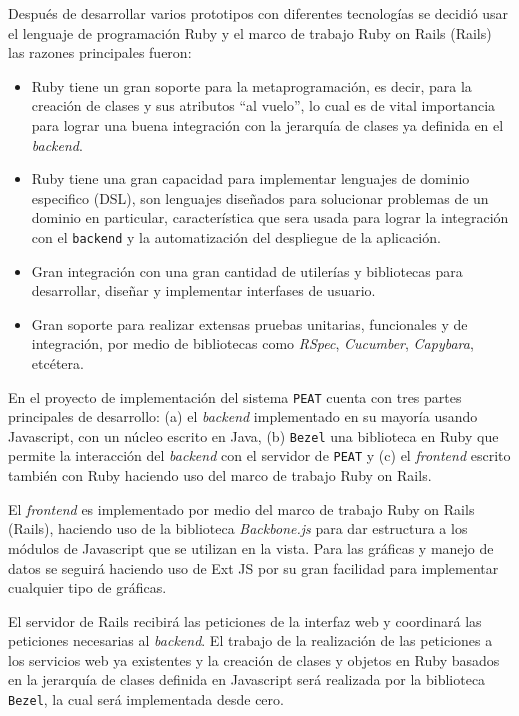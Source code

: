 Después de desarrollar varios prototipos con diferentes tecnologías se decidió
usar el lenguaje de programación Ruby y el marco de trabajo Ruby on Rails (Rails)
las razones principales fueron:

\begin{itemize}
\item Ruby tiene un gran soporte para la metaprogramación, es decir, para la
  creación de clases y sus atributos ``al vuelo'', lo cual es de vital
  importancia para lograr una buena integración con la jerarquía de clases
  ya definida en el \textit{backend}.
\item Ruby tiene una gran capacidad para implementar lenguajes de dominio
  especifico (DSL), son lenguajes diseñados para solucionar problemas de un dominio
  en particular, característica que sera usada para lograr la integración con el
  \texttt{backend} y la automatización del despliegue de la aplicación.
\item Gran integración con una gran cantidad de utilerías y bibliotecas para
  desarrollar, diseñar y implementar interfases de usuario.
\item Gran soporte para realizar extensas pruebas unitarias, funcionales
  y de integración, por medio de bibliotecas como \textit{RSpec}, \textit{Cucumber},
  \textit{Capybara}, etcétera.
\end{itemize}

En el proyecto de implementación del sistema \texttt{PEAT}
cuenta con tres partes principales de desarrollo:
(a) el \textit{backend}  implementado en su mayoría usando
Javascript, con un núcleo escrito en Java, (b) \texttt{Bezel}
una biblioteca en Ruby que permite la interacción del \textit{backend}
con el servidor de \texttt{PEAT} y (c) el \textit{frontend} escrito
también con Ruby haciendo uso del marco de trabajo Ruby on Rails.

El \textit{frontend} es implementado por medio del marco de trabajo
Ruby on Rails (Rails), haciendo uso de la biblioteca \textit{Backbone.js}
para dar estructura a los módulos de Javascript que se utilizan en la vista.
Para las gráficas y manejo de datos se seguirá haciendo uso de Ext JS
por su gran facilidad para implementar cualquier tipo de gráficas.

El servidor de Rails recibirá las peticiones de la interfaz web y
coordinará las peticiones necesarias al \textit{backend}. El trabajo
de la realización de las peticiones a los servicios web ya existentes
y la creación de clases y objetos en Ruby basados en la jerarquía de clases
definida en Javascript será realizada por la biblioteca \texttt{Bezel},
la cual será implementada desde cero.

